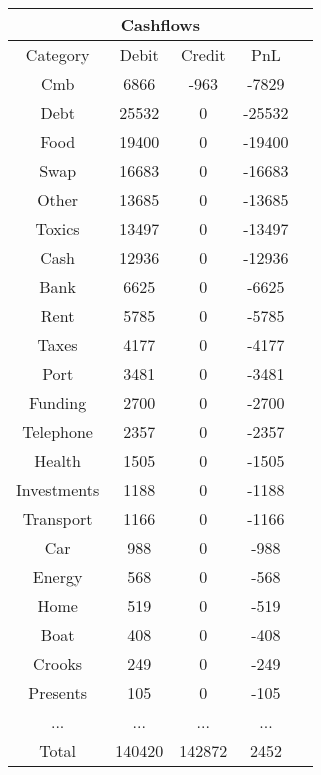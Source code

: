 \begin{longtable}{|c|c|c|c|c|}
\hline
\multicolumn{5}{|c|}{Cashflows} \\
\hline
Category & Debit & Credit & PnL \\
\hline
Cmb & 6866 & -963 & -7829\\
\hline
Debt & 25532 & 0 & -25532\\
\hline
Food & 19400 & 0 & -19400\\
\hline
Swap & 16683 & 0 & -16683\\
\hline
Other & 13685 & 0 & -13685\\
\hline
Toxics & 13497 & 0 & -13497\\
\hline
Cash & 12936 & 0 & -12936\\
\hline
Bank & 6625 & 0 & -6625\\
\hline
Rent & 5785 & 0 & -5785\\
\hline
Taxes & 4177 & 0 & -4177\\
\hline
Port & 3481 & 0 & -3481\\
\hline
Funding & 2700 & 0 & -2700\\
\hline
Telephone & 2357 & 0 & -2357\\
\hline
Health & 1505 & 0 & -1505\\
\hline
Investments & 1188 & 0 & -1188\\
\hline
Transport & 1166 & 0 & -1166\\
\hline
Car & 988 & 0 & -988\\
\hline
Energy & 568 & 0 & -568\\
\hline
Home & 519 & 0 & -519\\
\hline
Boat & 408 & 0 & -408\\
\hline
Crooks & 249 & 0 & -249\\
\hline
Presents & 105 & 0 & -105\\
\hline
 ... & ... & ... & ...\\
\hline
 Total & 140420 & 142872 & 2452 \\
\hline
\end{longtable}

